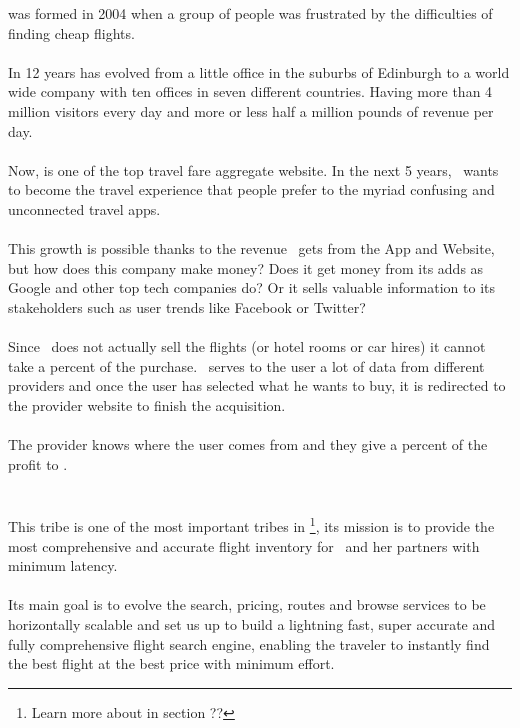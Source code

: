 \company\cite{skyscanner_strategy} was formed in 2004 when a group of people was frustrated by the difficulties of finding cheap flights.
\\\\
In 12 years has evolved from a little office in the suburbs of Edinburgh to a world wide company with ten offices in seven different countries. Having more than 4 million visitors every day and more or less half a million pounds of revenue per day.
\\\\
Now, is one of the top travel fare aggregate website. In the next 5 years, \company\ wants to become the travel experience that people prefer to the myriad confusing and unconnected travel apps.
\\\\
This growth is possible thanks to the revenue \company\ gets from the App and Website, but how does this company make money? Does it get money from its adds as Google and other top tech companies do? Or it sells valuable information to its stakeholders such as user trends like Facebook or Twitter?
\\\\
Since \company\ does not actually sell the flights (or hotel rooms or car hires) it cannot take a percent of the purchase. \company\ serves to the user a lot of data from different providers and once the user has selected what he wants to buy, it is redirected to the provider website to finish the acquisition.
\\\\
The provider knows where the user comes from and they give a percent of the profit to \company.


\section{\tribe}

This tribe\cite{marketplace_engine_home} is one of the most important tribes in \company\footnote{Learn more about \textit{} in section ??}, its mission is to provide the most comprehensive and accurate flight inventory for \company\ and her partners with minimum latency.
\\\\
Its main goal is to evolve the search, pricing, routes and browse services to be horizontally scalable and set us up to build a lightning fast, super accurate and fully comprehensive flight search engine, enabling the traveler to instantly find the best flight at the best price with minimum effort.

